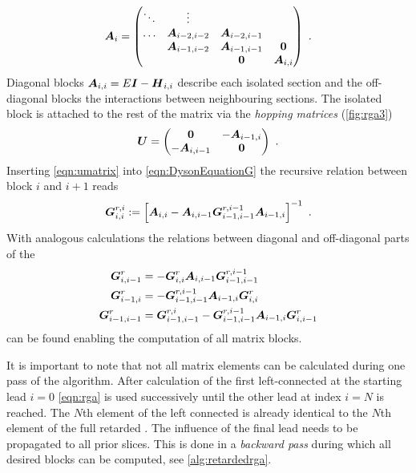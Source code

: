\begin{align}
\boldsymbol{A}_i = 
\begin{pmatrix}
\ddots 	& \vdots 	   & 		   & \\
\dots   & \boldsymbol{A}_{i-2,i-2}&\boldsymbol{A}_{i-2,i-1}& \\
     	& \boldsymbol{A}_{i-1,i-2}  &\boldsymbol{A}_{i-1,i-1}  & \boldsymbol{0} \\ 
	&  		   & \boldsymbol{0} 	   & \boldsymbol{A}_{i,i}
\end{pmatrix}\ .
\end{align}
Diagonal blocks $\boldsymbol{A}_{i,i} = E\boldsymbol{I}-\boldsymbol{H}_{i,i}$ describe each isolated section and the off-diagonal blocks the interactions between neighbouring sections. The isolated block is attached to the rest of the matrix via the \emph{hopping matrices} (\cref{fig:rga3})
\begin{align}
\boldsymbol{U} = 
\begin{pmatrix}
\boldsymbol{0}& -\boldsymbol{A}_{i-1,i}\\
-\boldsymbol{A}_{i,i-1}&\boldsymbol{0}
\end{pmatrix}\ .
\label{eqn:umatrix}
\end{align}
Inserting \cref{eqn:umatrix} into \cref{eqn:DysonEquationG} the recursive relation between block $i$ and $i+1$ reads 
\begin{align}
\mat{G}^{r,i}_{i,i} := \left[\mat{A}_{i,i}-\mat{A}_{i,i-1}\mat{G}^{r,i-1}_{i-1,i-1}\mat{A}_{i-1,i}\right]^{-1}\ .
\label{eqn:rga}
\end{align}
With analogous calculations the relations between diagonal and off-diagonal parts  of the \gfnc{} 
\begin{align}
\boldsymbol{G}^r_{i,i-1} &= -\boldsymbol{G}^r_{i,i}\boldsymbol{A}_{i,i-1}\boldsymbol{G}^{r,i-1}_{i-1,i-1}\\
\boldsymbol{G}^r_{i-1,i} &= -\boldsymbol{G}^{r,i-1}_{i-1,i-1}\boldsymbol{A}_{i-1,i} \boldsymbol{G}^{r}_{i,i}\\
\boldsymbol{G}^r_{i-1,i-1} &= \boldsymbol{G}^{r,i}_{i-1,i-1}-\boldsymbol{G}^{r,i-1}_{i-1,i-1}\boldsymbol{A}_{i-1,i}\boldsymbol{G}^{r}_{i,i-1}
\end{align}
can be found enabling the computation of all matrix blocks.\par
It is important to note that not all matrix elements can be calculated during one pass of the algorithm. After calculation of the first left-connected \gfnc{} at the starting lead $i=0$ \cref{eqn:rga} is used successively until the other lead at index $i=N$ is reached. The $N$th element of the left connected \gfnc{} is already identical to the $N$th element of the full retarded \gfnc{}. The influence of the final lead needs to be propagated to all prior slices. This is done in a \emph{backward pass} during which all desired blocks can be computed, see \cref{alg:retardedrga}.\par
